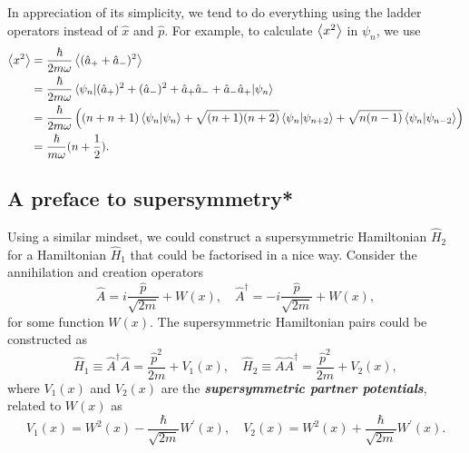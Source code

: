 \documentclass{article}
\theoremstyle{nonumberplain}
\begin{document}
In appreciation of its simplicity, we tend to do everything using the ladder operators instead of $\hat{x} $ and $\hat{p} $. For example, to calculate $\expval{x^2}$ in $\psi_n$, we use 
\[
    \begin{aligned}
    \expval{x^2} 
    &= \frac{\hbar }{2 m \omega }\expval{(\hat{a}_+ + \hat{a} _-)^2} \\
    &= \frac{\hbar }{2 m \omega } \ev{(\hat{a} _+)^2 + (\hat{a} _-)^2 + \hat{a} _+ \hat{a} _- + \hat{a} _- \hat{a} _+}{\psi_n} \\ 
    &= \frac{\hbar }{2 m \omega } \left(
        (n + n + 1) \braket{\psi_n} 
        + \sqrt{(n+1)(n+2)} \braket{\psi_n}{\psi_{n+2}}
        + \sqrt{n(n-1)} \braket{\psi_n}{\psi_{n-2}} 
    \right) \\
    &= \frac{\hbar }{ m \omega } (n + \frac{1}{2}).
    \end{aligned}  
\]
\subsection{A preface to supersymmetry*}
Using a similar mindset, we could construct a supersymmetric Hamiltonian $\hat{H}_2$ for a Hamiltonian $\hat{H}_1$ that could be factorised in a nice way. Consider the annihilation and creation operators 
\[
    \hat{A} = i \frac{\hat{p} }{\sqrt{2m} } + W(x), \quad 
    \hat{A}^{\dagger} = - i \frac{\hat{p} }{\sqrt{2 m } } + W(x),
\]
for some function $W(x).$ The supersymmetric Hamiltonian pairs could be constructed as 
\[
    \hat{H}_1 \equiv \hat{A}^{\dagger} \hat{A} = \frac{\hat{p} ^2}{2m} + V_1(x), 
    \quad 
    \hat{H}_2 \equiv \hat{A} \hat{A}^{\dagger} = \frac{\hat{p} ^2}{2m} + V_2 (x), 
\]
where $V_1(x)$ and $V_2(x)$ are the \textit{\textbf{supersymmetric partner potentials}}, related to $W(x)$ as 
\[
    V_1(x) = W^2(x) - \frac{\hbar }{\sqrt{2 m} } W^\prime (x), 
    \quad 
    V_2 (x) = W^{2} (x) + \frac{\hbar }{\sqrt{2 m} } W^\prime (x). 
\] 
\end{document}
